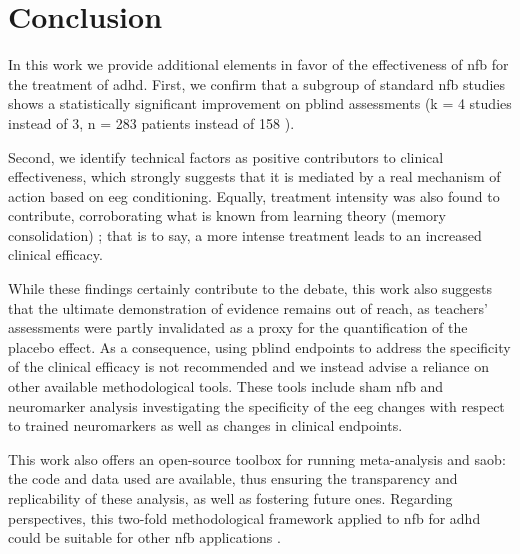 

\section{Conclusion}

In this work we provide additional elements in favor of the effectiveness of \gls{nfb} for the treatment of \gls{adhd}. First, 
we confirm that a subgroup of standard \gls{nfb} studies shows a statistically significant improvement on \gls{pblind} 
assessments (k = 4 studies instead of 3, n = 283 patients instead of 158 \citet{Cortese2016}). 

Second, we identify technical factors as positive contributors to clinical effectiveness, which strongly suggests 
that it is mediated by a real mechanism of action based on \gls{eeg} conditioning. Equally, treatment intensity was also found to 
contribute, corroborating what is known from learning theory (memory consolidation) \citep{Mowrer1960}; that is to say, 
a more intense treatment leads to an increased clinical efficacy.

While these findings certainly contribute to the debate, this work also suggests that the ultimate demonstration of evidence 
remains out of reach, as teachers’ assessments were partly invalidated as a proxy for the quantification of the placebo effect. 
As a consequence, using \gls{pblind} endpoints to address the specificity of the clinical efficacy is not recommended 
and we instead advise a reliance on other available methodological tools. These tools include sham \gls{nfb} and neuromarker 
analysis investigating the specificity of the \gls{eeg} changes with respect to trained neuromarkers as well as changes 
in clinical endpoints.

This work also offers an open-source toolbox for running meta-analysis and \gls{saob}: the code and data used are available, 
thus ensuring the transparency and replicability of these analysis, as well as fostering future ones.
Regarding perspectives, this two-fold methodological framework applied to \gls{nfb} for \gls{adhd} could 
be suitable for other \gls{nfb} applications \citep{Marzbani2016}.

